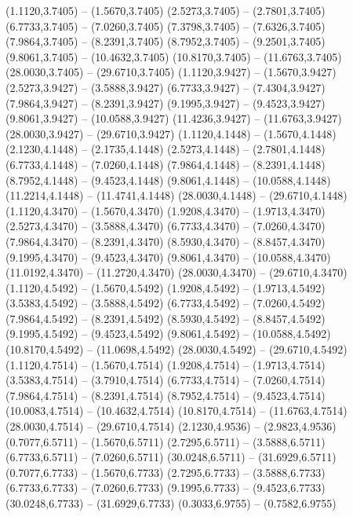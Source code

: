 {\begin{scope}[shift={(#1,#2)}]
    (1.1120,3.7405) -- (1.5670,3.7405)
    (2.5273,3.7405) -- (2.7801,3.7405)
    (6.7733,3.7405) -- (7.0260,3.7405)
    (7.3798,3.7405) -- (7.6326,3.7405)
    (7.9864,3.7405) -- (8.2391,3.7405)
    (8.7952,3.7405) -- (9.2501,3.7405)
    (9.8061,3.7405) -- (10.4632,3.7405)
    (10.8170,3.7405) -- (11.6763,3.7405)
    (28.0030,3.7405) -- (29.6710,3.7405)
    (1.1120,3.9427) -- (1.5670,3.9427)
    (2.5273,3.9427) -- (3.5888,3.9427)
    (6.7733,3.9427) -- (7.4304,3.9427)
    (7.9864,3.9427) -- (8.2391,3.9427)
    (9.1995,3.9427) -- (9.4523,3.9427)
    (9.8061,3.9427) -- (10.0588,3.9427)
    (11.4236,3.9427) -- (11.6763,3.9427)
    (28.0030,3.9427) -- (29.6710,3.9427)
    (1.1120,4.1448) -- (1.5670,4.1448)
    (2.1230,4.1448) -- (2.1735,4.1448)
    (2.5273,4.1448) -- (2.7801,4.1448)
    (6.7733,4.1448) -- (7.0260,4.1448)
    (7.9864,4.1448) -- (8.2391,4.1448)
    (8.7952,4.1448) -- (9.4523,4.1448)
    (9.8061,4.1448) -- (10.0588,4.1448)
    (11.2214,4.1448) -- (11.4741,4.1448)
    (28.0030,4.1448) -- (29.6710,4.1448)
    (1.1120,4.3470) -- (1.5670,4.3470)
    (1.9208,4.3470) -- (1.9713,4.3470)
    (2.5273,4.3470) -- (3.5888,4.3470)
    (6.7733,4.3470) -- (7.0260,4.3470)
    (7.9864,4.3470) -- (8.2391,4.3470)
    (8.5930,4.3470) -- (8.8457,4.3470)
    (9.1995,4.3470) -- (9.4523,4.3470)
    (9.8061,4.3470) -- (10.0588,4.3470)
    (11.0192,4.3470) -- (11.2720,4.3470)
    (28.0030,4.3470) -- (29.6710,4.3470)
    (1.1120,4.5492) -- (1.5670,4.5492)
    (1.9208,4.5492) -- (1.9713,4.5492)
    (3.5383,4.5492) -- (3.5888,4.5492)
    (6.7733,4.5492) -- (7.0260,4.5492)
    (7.9864,4.5492) -- (8.2391,4.5492)
    (8.5930,4.5492) -- (8.8457,4.5492)
    (9.1995,4.5492) -- (9.4523,4.5492)
    (9.8061,4.5492) -- (10.0588,4.5492)
    (10.8170,4.5492) -- (11.0698,4.5492)
    (28.0030,4.5492) -- (29.6710,4.5492)
    (1.1120,4.7514) -- (1.5670,4.7514)
    (1.9208,4.7514) -- (1.9713,4.7514)
    (3.5383,4.7514) -- (3.7910,4.7514)
    (6.7733,4.7514) -- (7.0260,4.7514)
    (7.9864,4.7514) -- (8.2391,4.7514)
    (8.7952,4.7514) -- (9.4523,4.7514)
    (10.0083,4.7514) -- (10.4632,4.7514)
    (10.8170,4.7514) -- (11.6763,4.7514)
    (28.0030,4.7514) -- (29.6710,4.7514)
    (2.1230,4.9536) -- (2.9823,4.9536)
    (0.7077,6.5711) -- (1.5670,6.5711)
    (2.7295,6.5711) -- (3.5888,6.5711)
    (6.7733,6.5711) -- (7.0260,6.5711)
    (30.0248,6.5711) -- (31.6929,6.5711)
    (0.7077,6.7733) -- (1.5670,6.7733)
    (2.7295,6.7733) -- (3.5888,6.7733)
    (6.7733,6.7733) -- (7.0260,6.7733)
    (9.1995,6.7733) -- (9.4523,6.7733)
    (30.0248,6.7733) -- (31.6929,6.7733)
    (0.3033,6.9755) -- (0.7582,6.9755)

\end{scope}}
